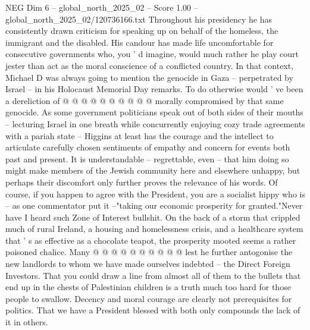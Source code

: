 \begin{textsample}{NEG Dim 6 – global\_north\_2025\_02 – Score 1.00 – global\_north\_2025\_02/120736166.txt}
Throughout his presidency he has consistently drawn criticism for speaking up on behalf of the homeless, the immigrant and the disabled.
His candour has made life uncomfortable for consecutive governments who, you ' d imagine, would much rather he play court jester than act as the moral conscience of a conflicted country.
In that context, Michael D was always going to mention the genocide in Gaza -- perpetrated by Israel -- in his Holocaust Memorial Day remarks.
To do otherwise would ' ve been a dereliction of @ @ @ @ @ @ @ @ @ @ morally compromised by that same genocide.
As some government politicians speak out of both sides of their mouths -- lecturing Israel in one breath while concurrently enjoying cozy trade agreements with a pariah state -- Higgins at least has the courage and the intellect to articulate carefully chosen sentiments of empathy and concern for events both past and present.
It is understandable -- regrettable, even -- that him doing so might make members of the Jewish community here and elsewhere unhappy, but perhaps their discomfort only further proves the relevance of his words.
Of course, if you happen to agree with the President, you are a socialist hippy who is -- as one commentator put it --"taking our economic prosperity for granted."Never have I heard such Zone of Interest bullshit.
On the back of a storm that crippled much of rural Ireland, a housing and homelessness crisis, and a healthcare system that ' s as effective as a chocolate teapot, the prosperity mooted seems a rather poisoned chalice.
Many @ @ @ @ @ @ @ @ @ @ lest he further antogonise the new landlords to whom we have made ourselves indebted -- the Direct Foreign Investors.
That you could draw a line from almost all of them to the bullets that end up in the chests of Palestinian children is a truth much too hard for those people to swallow.
Decency and moral courage are clearly not prerequisites for politics.
That we have a President blessed with both only compounds the lack of it in others.

\end{textsample}
